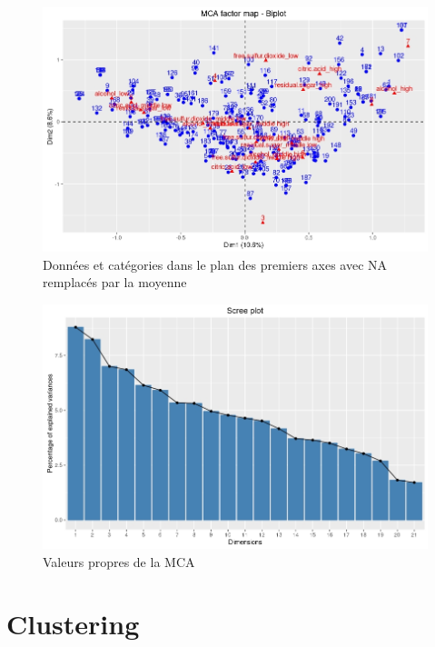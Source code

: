 \documentclass[11pt,a4paper]{article}
\begin{document}
\begin{figure}[ht]

\includegraphics[width=\textwidth,keepaspectratio]{"biplot-nona"}

\caption{Données et catégories dans le plan des premiers axes avec NA remplacés par la moyenne}
\label{fig:biplot}
\end{figure}


\begin{figure}[ht]

\includegraphics[width=\textwidth,keepaspectratio]{"mca-eigen"}

\caption{Valeurs propres de la MCA}
\label{fig:screeplot}
\end{figure}



\section{Clustering}
\end{document}

